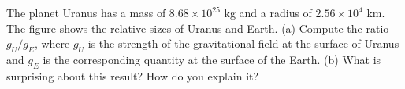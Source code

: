 The planet Uranus has a mass of $8.68\times10^{25}$  kg
and a radius of $2.56\times10^4$  km. The figure shows the
relative sizes of Uranus and Earth.\hwendpart
 (a) Compute the ratio
$g_U/g_E$, where $g_U$ is the strength of the gravitational
field at the surface of Uranus and $g_E$ is the corresponding
quantity at the surface of the Earth.\answercheck\hwendpart
 (b) What is surprising
about this result? How do you explain it?
